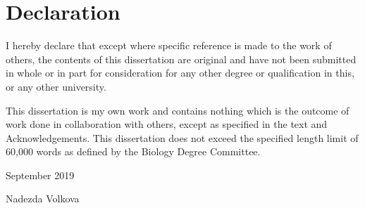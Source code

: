 \documentclass[12pt,a4paper,oneside]{report}
\begin{document}
\pagestyle{empty}

\chapter*{Declaration}

I hereby declare that except where specific reference is made to the work of others, the
contents of this dissertation are original and have not been submitted in whole or in part
for consideration for any other degree or qualification in this, or any other university.

This dissertation is my own work and contains nothing which is the outcome of work done in
collaboration with others, except as specified in the text and Acknowledgements. This
dissertation does not exceed the specified length limit of 60,000 words as defined by the
Biology Degree Committee.

\vspace*{10mm}
September 2019

\vspace*{5mm}
Nadezda Volkova
\end{document}

